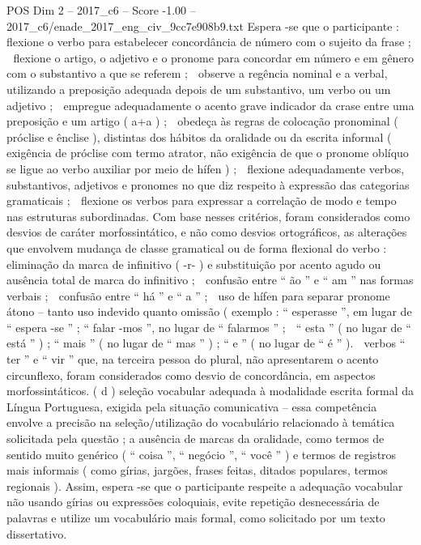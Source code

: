 \begin{textsample}{POS Dim 2 – 2017\_c6 – Score -1.00 – 2017\_c6/enade\_2017\_eng\_civ\_9cc7e908b9.txt}
Espera -se que o participante :  flexione o verbo para estabelecer concordância de número com o sujeito da frase ;  flexione o artigo, o adjetivo e o pronome para concordar em número e em gênero com o substantivo a que se referem ;  observe a regência nominal e a verbal, utilizando a preposição adequada depois de um substantivo, um verbo ou um adjetivo ;  empregue adequadamente o acento grave indicador da crase entre uma preposição e um artigo ( a+a ) ;  obedeça às regras de colocação pronominal ( próclise e ênclise ), distintas dos hábitos da oralidade ou da escrita informal ( exigência de próclise com termo atrator, não exigência de que o pronome oblíquo se ligue ao verbo auxiliar por meio de hífen ) ;  flexione adequadamente verbos, substantivos, adjetivos e pronomes no que diz respeito à expressão das categorias gramaticais ;  flexione os verbos para expressar a correlação de modo e tempo nas estruturas subordinadas.
Com base nesses critérios, foram considerados como desvios de caráter morfossintático, e não como desvios ortográficos, as alterações que envolvem mudança de classe gramatical ou de forma flexional do verbo :  eliminação da marca de infinitivo ( -r- ) e substituição por acento agudo ou ausência total de marca do infinitivo ;  confusão entre “ ão ” e “ am ” nas formas verbais ;  confusão entre “ há ” e “ a ” ;  uso de hífen para separar pronome átono – tanto uso indevido quanto omissão ( exemplo : “ esperasse ”, em lugar de “ espera -se ” ; “ falar -mos ”, no lugar de “ falarmos ” ;  “ esta ” ( no lugar de “ está ” ) ; “ mais ” ( no lugar de “ mas ” ) ; “ e ” ( no lugar de “ é ” ).  verbos “ ter ” e “ vir ” que, na terceira pessoa do plural, não apresentarem o acento circunflexo, foram considerados como desvio de concordância, em aspectos morfossintáticos. ( d ) seleção vocabular adequada à modalidade escrita formal da Língua Portuguesa, exigida pela situação comunicativa – essa competência envolve a precisão na seleção/utilização do vocabulário relacionado à temática solicitada pela questão ; a ausência de marcas da oralidade, como termos de sentido muito genérico ( “ coisa ”, “ negócio ”, “ você ” ) e termos de registros mais informais ( como gírias, jargões, frases feitas, ditados populares, termos regionais ).
Assim, espera -se que o participante respeite a adequação vocabular não usando gírias ou expressões coloquiais, evite repetição desnecessária de palavras e utilize um vocabulário mais formal, como solicitado por um texto dissertativo.

\end{textsample}
